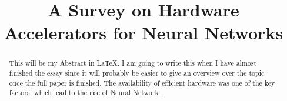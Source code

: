 \documentclass[conference]{IEEEtran}
\begin{document}
\title{A Survey on Hardware Accelerators for Neural Networks}
\author{
}

\maketitle

\begin{abstract}
This will be my Abstract in \LaTeX.
I am going to write this when I have almost finished the essay since it will probably be easier to give an overview over the topic once the full paper is finished.
The availability of efficient hardware was one of the key factors, which lead to the rise of Neural Network \cite{historyfpgas}. 
\end{abstract}
\end{document}
